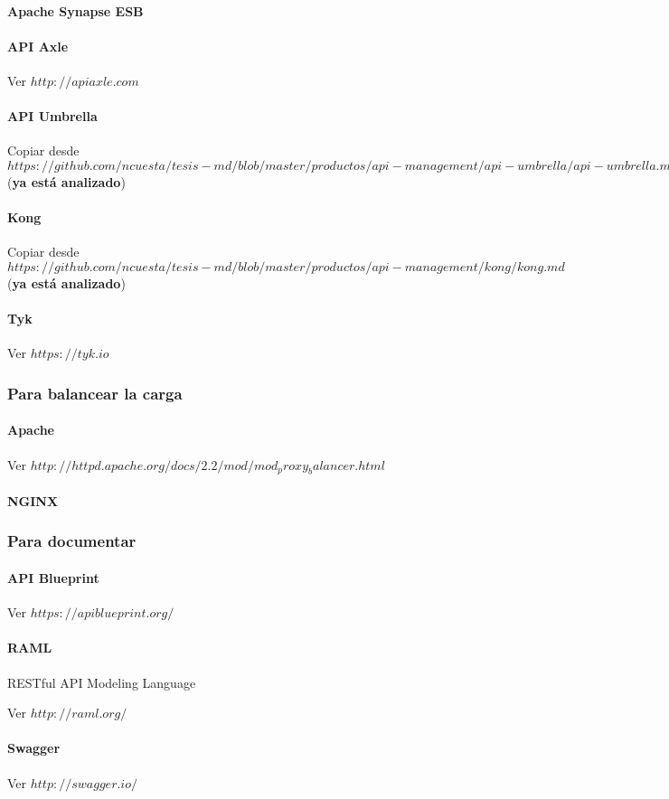 \paragraph{Apache Synapse ESB}

\paragraph{API Axle}

Ver $http://apiaxle.com$

\paragraph{API Umbrella}

Copiar desde $https://github.com/ncuesta/tesis-md/blob/master/productos/api-management/api-umbrella/api-umbrella.md$ (\textbf{ya está analizado})

\paragraph{Kong}
\label{soa:tecnologias:kong}

Copiar desde $https://github.com/ncuesta/tesis-md/blob/master/productos/api-management/kong/kong.md$ (\textbf{ya está analizado})

\paragraph{Tyk}

Ver $https://tyk.io$


\subsubsection{Para balancear la carga}

\paragraph{Apache}

Ver $http://httpd.apache.org/docs/2.2/mod/mod_proxy_balancer.html$

\paragraph{NGINX}


\subsubsection{Para documentar}

\paragraph{API Blueprint}

Ver $https://apiblueprint.org/$

\paragraph{RAML}

RESTful API Modeling Language

Ver $http://raml.org/$

\paragraph{Swagger}

Ver $http://swagger.io/$

